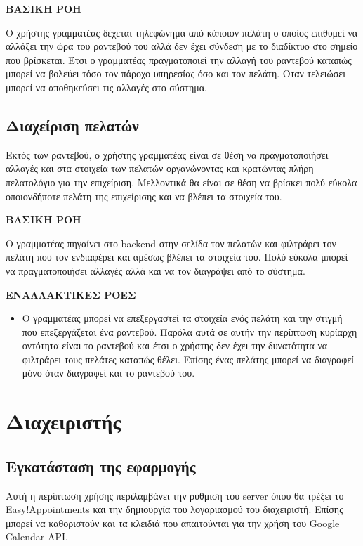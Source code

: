 \textbf{ΒΑΣΙΚΗ ΡΟΗ}

Ο χρήστης γραμματέας δέχεται τηλεφώνημα από κάποιον πελάτη ο οποίος επιθυμεί να αλλάξει την ώρα του ραντεβού του αλλά δεν έχει σύνδεση με το διαδίκτυο στο σημείο που βρίσκεται. Έτσι ο γραμματέας πραγματοποιεί την αλλαγή του ραντεβού καταπώς μπορεί να βολεύει τόσο τον πάροχο υπηρεσίας όσο και τον πελάτη. Όταν τελειώσει μπορεί να αποθηκεύσει τις αλλαγές στο σύστημα.

\subsection{Διαχείριση πελατών}
Εκτός των ραντεβού, ο χρήστης γραμματέας είναι σε θέση να πραγματοποιήσει αλλαγές και στα στοιχεία των πελατών οργανώνοντας και κρατώντας πλήρη πελατολόγιο για την επιχείριση. Μελλοντικά θα είναι σε θέση να βρίσκει πολύ εύκολα οποιονδήποτε πελάτη της επιχείρισης και να βλέπει τα στοιχεία του.

\textbf{ΒΑΣΙΚΗ ΡΟΗ}

Ο γραμματέας πηγαίνει στο backend στην σελίδα τον πελατών και φιλτράρει τον πελάτη που τον ενδιαφέρει και αμέσως βλέπει τα στοιχεία του. Πολύ εύκολα μπορεί να πραγματοποιήσει αλλαγές αλλά και να τον διαγράψει από το σύστημα. 

\textbf{ΕΝΑΛΛΑΚΤΙΚΕΣ ΡΟΕΣ}

\begin{itemize}
\item Ο γραμματέας μπορεί να επεξεργαστεί τα στοιχεία ενός πελάτη και την στιγμή που επεξεργάζεται ένα ραντεβού. Παρόλα αυτά σε αυτήν την περίπτωση κυρίαρχη οντότητα είναι το ραντεβού και έτσι ο χρήστης δεν έχει την δυνατότητα να φιλτράρει τους πελάτες καταπώς θέλει. Επίσης ένας πελάτης μπορεί να διαγραφεί μόνο όταν διαγραφεί και το ραντεβού του.
\end{itemize}

\section{Διαχειριστής}
\subsection{Εγκατάσταση της εφαρμογής}
Αυτή η περίπτωση χρήσης περιλαμβάνει την ρύθμιση του server όπου θα τρέξει το Easy!Appointments και την δημιουργία του λογαριασμού του διαχειριστή. Επίσης μπορεί να καθοριστούν και τα κλειδιά που απαιτούνται για την χρήση του Google Calendar API.

